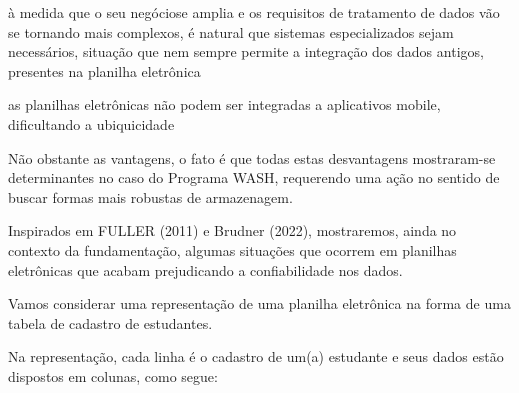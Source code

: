 \documentclass[
12pt,		%
openright,	%
twoside,  %
a4paper,			%
chapter=TITLE,		%
english,			%
french,				%
spanish,			%
brazil				%
]{USPSC-classe/USPSC}
\begin{document}
\begin{alineas}
\item \`a medida que o seu \textquotedbl neg\'ocio\textquotedbl  se amplia e os requisitos de tratamento de dados v\~ao se tornando mais complexos, \'e natural que sistemas especializados sejam necess\'arios, situa\c{c}\~ao que nem sempre permite a integra\c{c}\~ao dos dados antigos, presentes na planilha eletr\^onica
\item as planilhas eletr\^onicas n\~ao podem ser integradas a aplicativos mobile, dificultando a ubiquicidade
\end{alineas}

N\~ao obstante as vantagens, o fato \'e que todas estas desvantagens mostraram-se determinantes no caso do Programa WASH, requerendo uma a\c{c}\~ao no sentido de buscar formas mais robustas de armazenagem.

















Inspirados em  FULLER (2011) e  Brudner (2022), mostraremos, ainda no contexto da fundamenta\c{c}\~ao, algumas situa\c{c}\~oes que ocorrem em planilhas eletr\^onicas que acabam prejudicando a confiabilidade nos dados.

















Vamos considerar uma representa\c{c}\~ao de uma planilha eletr\^onica na forma de uma tabela de cadastro de estudantes.

















Na representa\c{c}\~ao, cada linha \'e o cadastro de um(a) estudante e seus dados est\~ao dispostos em colunas, como segue:
\end{document}
